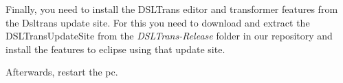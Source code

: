 Finally, you need to install the DSLTrans editor and transformer features from the Dsltrans update site.
For this you need to download and extract the DSLTransUpdateSite from the \emph{DSLTrans-Release} folder in our repository and install the features to eclipse using that update site.

Afterwards, restart the pc.

\clearpage

